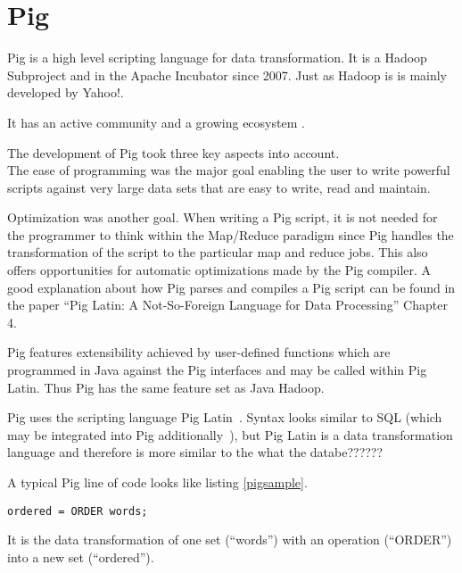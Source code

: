\section{Pig}

Pig is a high level scripting language for data transformation. It is a Hadoop Subproject and in the Apache Incubator since 2007. Just as Hadoop is is mainly developed by Yahoo!. 

It has an active community and a growing ecosystem .

The development of Pig took three key aspects into account. \\
The ease of programming was the major goal enabling the user to write powerful scripts against very large data sets that are easy to write, read and maintain.~\cite{pigWebsite}

Optimization was another goal. When writing a Pig script, it is not needed for the programmer to think within the Map/Reduce paradigm since Pig handles the transformation of the script to the particular map and reduce jobs. This also offers opportunities for automatic optimizations made by the Pig compiler. A good explanation about how Pig parses and compiles a Pig script can be found in the paper ``Pig Latin: A Not-So-Foreign Language for Data Processing'' Chapter 4.~\cite{pigNotForeign}

Pig features extensibility achieved by user-defined functions which are programmed in Java against the Pig interfaces and may be called within Pig Latin. Thus Pig has the same feature set as Java Hadoop.

Pig uses the scripting language Pig Latin~\cite{pigManual}. Syntax looks similar to SQL (which may be integrated into Pig additionally~\cite{pigSql}), but Pig Latin is a data transformation language and therefore is more similar to the what the databe??????  

A typical Pig line of code looks like listing \ref{pigsample}.

\begin{lstlisting}[language=pig,caption=A typical Pig line of code,float,label=pigsample]
ordered = ORDER words;
\end{lstlisting}

It is the data transformation of one set (``words'') with an operation (``ORDER'') into a new set (``ordered'').
                                                                                                               
